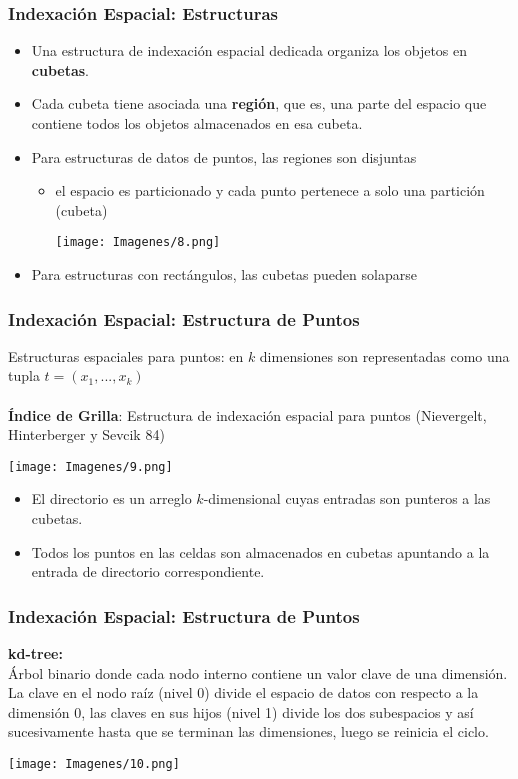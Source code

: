 \documentclass[12pt]{beamer}
\begin{document}
\begin{frame}
\frametitle{Indexaci\'on Espacial: Estructuras}
\begin{itemize}
\item Una estructura de indexaci\'on espacial dedicada organiza los objetos en \textbf{cubetas}.
\item Cada cubeta tiene asociada una \textbf{regi\'on}, que es, una parte del espacio que contiene todos los objetos almacenados en esa cubeta.
\item Para estructuras de datos de puntos, las regiones son disjuntas
\begin{itemize}
\item el espacio es particionado y cada punto pertenece a solo una partici\'on (cubeta)
\begin{center}\texttt{[image: Imagenes/8.png]}
\end{center}\end{itemize}
\item Para estructuras con rect\'angulos, las cubetas pueden solaparse
\end{itemize}
\end{frame}

\begin{frame}
\frametitle{Indexaci\'on Espacial: Estructura de Puntos}
Estructuras espaciales para puntos: en $k$ dimensiones son representadas como una tupla $t = (x_1,...,x_k)$\\
\ \\
\textbf{\'Indice de Grilla}: Estructura de indexaci\'on espacial para puntos (Nievergelt, Hinterberger y Sevcik 84)
\begin{center}
\texttt{[image: Imagenes/9.png]}
\end{center}
\begin{itemize}

\item El directorio es un arreglo $k$-dimensional cuyas entradas son punteros a las cubetas.
\item Todos los puntos en las celdas son almacenados en cubetas apuntando a la entrada de directorio correspondiente.
\end{itemize} 
\end{frame}

\begin{frame}
\frametitle{Indexaci\'on Espacial: Estructura de Puntos}
\textbf{kd-tree:}\\
\'Arbol binario donde cada nodo interno contiene un valor clave de una dimensi\'on.\\
La clave en el nodo ra\'iz (nivel 0) divide el espacio de datos con respecto a la dimensi\'on 0, las claves en sus hijos (nivel 1) divide los dos subespacios y as\'i sucesivamente hasta que se terminan las dimensiones, luego se reinicia el ciclo.\\
\begin{center}
\texttt{[image: Imagenes/10.png]}
\end{center}
\end{frame}
\end{document}
